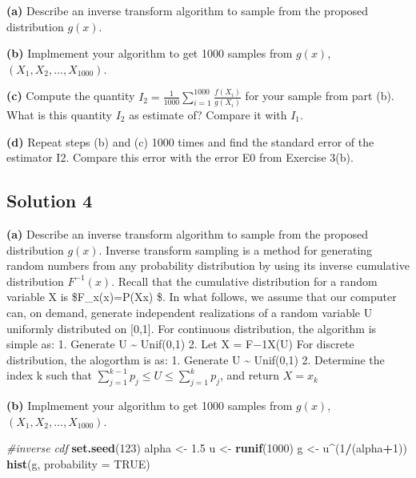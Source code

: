 \documentclass[
]{article}
\newenvironment{Shaded}{\begin{snugshade}}{\end{snugshade}}
\newcommand{\CommentTok}[1]{\textcolor[rgb]{0.56,0.35,0.01}{\textit{#1}}}
\newcommand{\DataTypeTok}[1]{\textcolor[rgb]{0.13,0.29,0.53}{#1}}
\newcommand{\DecValTok}[1]{\textcolor[rgb]{0.00,0.00,0.81}{#1}}
\newcommand{\FloatTok}[1]{\textcolor[rgb]{0.00,0.00,0.81}{#1}}
\newcommand{\KeywordTok}[1]{\textcolor[rgb]{0.13,0.29,0.53}{\textbf{#1}}}
\newcommand{\NormalTok}[1]{#1}
\newcommand{\OperatorTok}[1]{\textcolor[rgb]{0.81,0.36,0.00}{\textbf{#1}}}
\newcommand{\OtherTok}[1]{\textcolor[rgb]{0.56,0.35,0.01}{#1}}
\newcommand{\StringTok}[1]{\textcolor[rgb]{0.31,0.60,0.02}{#1}}
\begin{document}
\textbf{(a)} Describe an inverse transform algorithm to sample from the
proposed distribution \(g(x)\).

\textbf{(b)} Implmement your algorithm to get 1000 samples from
\(g(x)\), \((X_1, X_2, \ldots, X_{1000})\).

\textbf{(c)} Compute the quantity
\(I_2 = \frac{1}{1000} \sum_{i=1}^{1000} \frac{f(X_i)}{g(X_i)}\) for
your sample from part (b). What is this quantity \(I_2\) as estimate of?
Compare it with \(I_1\).

\textbf{(d)} Repeat steps (b) and (c) 1000 times and find the standard
error of the estimator I2. Compare this error with the error E0 from
Exercise 3(b).

\hypertarget{solution-4}{%
\subsection{Solution 4}\label{solution-4}}

\textbf{(a)} Describe an inverse transform algorithm to sample from the
proposed distribution \(g(x)\). Inverse transform sampling is a method
for generating random numbers from any probability distribution by using
its inverse cumulative distribution \(F^{-1}(x)\). Recall that the
cumulative distribution for a random variable X is \$F\_x(x)=P(X\leq x)
\$. In what follows, we assume that our computer can, on demand,
generate independent realizations of a random variable U uniformly
distributed on {[}0,1{]}. For continuous distribution, the algorithm is
simple as: 1. Generate U \textasciitilde{} Unif(0,1) 2. Let X = F−1X(U)
For discrete distribution, the alogorthm is as: 1. Generate U
\textasciitilde{} Unif(0,1) 2. Determine the index k such that
\(\sum_{j=1}^{k-1} p_j \leq U \leq \sum_{j=1}^{k} p_j\), and return
\(X=x_k\)

\textbf{(b)} Implmement your algorithm to get 1000 samples from
\(g(x)\), \((X_1, X_2, \ldots, X_{1000})\).

\begin{Shaded}
\begin{Highlighting}[]
\CommentTok{#inverse cdf}
\KeywordTok{set.seed}\NormalTok{(}\DecValTok{123}\NormalTok{)}
\NormalTok{alpha <-}\StringTok{ }\FloatTok{1.5}
\NormalTok{u <-}\StringTok{ }\KeywordTok{runif}\NormalTok{(}\DecValTok{1000}\NormalTok{)}
\NormalTok{g <-}\StringTok{ }\NormalTok{u}\OperatorTok{^}\NormalTok{(}\DecValTok{1}\OperatorTok{/}\NormalTok{(alpha}\OperatorTok{+}\DecValTok{1}\NormalTok{))}
\KeywordTok{hist}\NormalTok{(g, }\DataTypeTok{probability =} \OtherTok{TRUE}\NormalTok{)}
\end{Highlighting}
\end{Shaded}
\end{document}
